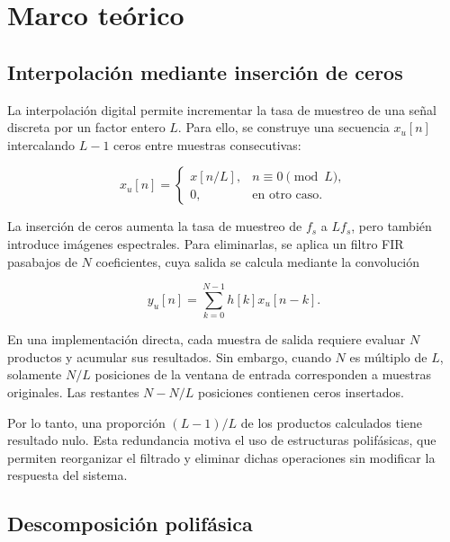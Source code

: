 \documentclass[10pt,a4paper]{article}
\begin{document}
\section{Marco teórico}
\label{sec:marco-teorico}


\subsection{Interpolación mediante inserción de ceros}

La interpolación digital permite incrementar la tasa de muestreo de una
señal discreta por un factor entero $L$. Para ello, se construye una
secuencia $x_u[n]$ intercalando $L-1$ ceros entre muestras consecutivas:

\begin{equation}
x_u[n]=
\begin{cases}
x[n/L], & n \equiv 0 \pmod L,\\
0,      & \text{en otro caso}.
\end{cases}
\label{eq:upsampling}
\end{equation}

La inserción de ceros aumenta la tasa de muestreo de $f_s$ a $Lf_s$,
pero también introduce imágenes espectrales. Para eliminarlas, se
aplica un filtro FIR pasabajos de $N$ coeficientes, cuya salida se
calcula mediante la convolución

\begin{equation}
y_u[n]=\sum_{k=0}^{N-1}h[k]x_u[n-k].
\label{eq:fir-directo}
\end{equation}

En una implementación directa, cada muestra de salida requiere
evaluar $N$ productos y acumular sus resultados. Sin embargo, cuando
$N$ es múltiplo de $L$, solamente $N/L$ posiciones de la ventana de
entrada corresponden a muestras originales. Las restantes $N-N/L$
posiciones contienen ceros insertados.

Por lo tanto, una proporción $(L-1)/L$ de los productos calculados
tiene resultado nulo. Esta redundancia motiva el uso de estructuras
polifásicas, que permiten reorganizar el filtrado y eliminar dichas
operaciones sin modificar la respuesta del sistema.

\subsection{Descomposición polifásica}
\end{document}

